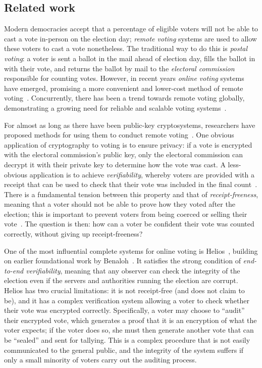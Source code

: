 \documentclass[12pt,a4paper]{article}
\theoremstyle{definition}
\begin{document}
\subsection{Related work}
Modern democracies accept that a percentage of eligible voters will not be able to cast a vote in-person on the election day; \textit{remote voting} systems are used to allow these voters to cast a vote nonetheless. The traditional way to do this is \textit{postal voting}: a voter is sent a ballot in the mail ahead of election day, fills the ballot in with their vote, and returns the ballot by mail to the \textit{electoral commission} responsible for counting votes. However, in recent years \textit{online voting} systems have emerged, promising a more convenient and lower-cost method of remote voting~\cite{nswivote,scytlsvote}. Concurrently, there has been a trend towards remote voting globally, demonstrating a growing need for reliable and scalable voting systems~\cite{VEC_PostalVoting_Position,rallings2010,gjosteen2011norwegian}.

For almost as long as there have been public-key cryptosystems, researchers have proposed methods for using them to conduct remote voting~\cite{cohen1985robust}. One obvious application of cryptography to voting is to ensure privacy: if a vote is encrypted with the electoral commission's public key, only the electoral commission can decrypt it with their private key to determine how the vote was cast. A less-obvious application is to achieve \textit{verifiability}, whereby voters are provided with a receipt that can be used to check that their vote was included in the final count~\cite{benaloh1987verifiable}. There is a fundamental tension between this property and that of \textit{receipt-freeness}, meaning that a voter should not be able to prove how they voted after the election; this is important to prevent voters from being coerced or selling their vote~\cite{benaloh1994receipt}. The question is then: how can a voter be confident their vote was counted correctly, without giving up receipt-freeness?

One of the most influential complete systems for online voting is Helios~\cite{adida2008helios}, building on earlier foundational work by Benaloh~\cite{benaloh2006simple}. It satisfies the strong condition of \textit{end-to-end verifiability}, meaning that any observer can check the integrity of the election even if the servers and authorities running the election are corrupt. Helios has two crucial limitations: it is not receipt-free (and does not claim to be), and it has a complex verification system allowing a voter to check whether their vote was encrypted correctly. Specifically, a voter may choose to ``audit'' their encrypted vote, which generates a proof that it is an encryption of what the voter expects; if the voter does so, she must then generate another vote that can be ``sealed'' and sent for tallying. This is a complex procedure that is not easily communicated to the general public, and the integrity of the system suffers if only a small minority of voters carry out the auditing process.
\end{document}
